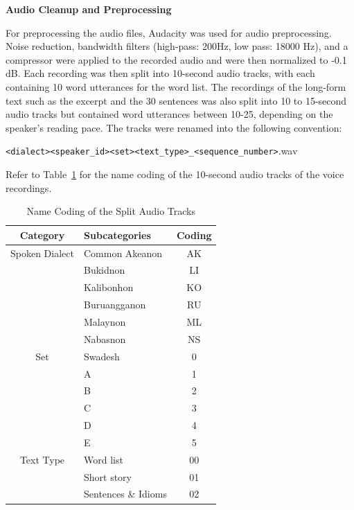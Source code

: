 \textbf{Audio Cleanup and Preprocessing}

For preprocessing the audio files, Audacity was used for audio preprocessing. Noise reduction, bandwidth filters (high-pass: 200Hz, low pass: 18000 Hz), and a compressor were applied to the recorded audio and were then normalized to -0.1 dB. Each recording was then split into 10-second audio tracks, with each containing 10 word utterances for the word list. The recordings of the long-form text such as the excerpt and the 30 sentences was also split into 10 to 15-second audio tracks but contained word utterances between 10-25, depending on the speaker's reading pace. The tracks were renamed into the following convention:

\texttt{\textless dialect\textgreater\textless speaker\_id\textgreater\textless set\textgreater\textless text\_type\textgreater\_\textless sequence\_number\textgreater}.wav

Refer to Table~\ref{tab:namecoding} for the name coding of the 10-second audio tracks of the voice recordings.

\begin{table}[H]
   \centering
   \caption{Name Coding of the Split Audio Tracks} \vspace{0.25em}
   \label{tab:namecoding}
   
   \renewcommand{\arraystretch}{1.5} %
   \setlength{\tabcolsep}{10pt} %
   
   \begin{tabular}{|c|p{2in}|c|}
   \hline
   \textbf{Category} & \textbf{Subcategories} & \textbf{Coding} \\
   \hline
   Spoken Dialect & Common Akeanon & AK \\ 
   & Bukidnon & LI \\ 
   & Kalibonhon & KO \\ 
   & Buruangganon & RU \\ 
   & Malaynon & ML \\ 
   & Nabasnon & NS \\
   \hline
   Set & Swadesh & 0 \\ 
   & A & 1 \\ 
   & B & 2 \\ 
   & C & 3 \\ 
   & D & 4 \\  
   & E & 5 \\ 
   \hline
   Text Type & Word list & 00 \\ 
   & Short story & 01 \\ 
   & Sentences \& Idioms & 02 \\ 
   \hline
   \end{tabular}
\end{table}
   
